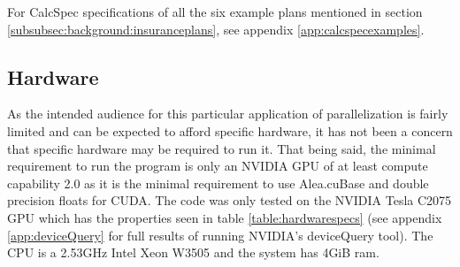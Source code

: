 For CalcSpec specifications of all the six example plans mentioned in section \ref{subsubsec:background:insuranceplans}, see appendix \ref{app:calcspecexamples}.

\subsection{Hardware}\label{subsec:background:hardware}
As the intended audience for this particular application of parallelization is fairly limited and can be expected to afford specific hardware, it has not been a concern that specific hardware may be required to run it.
That being said, the minimal requirement to run the program is only an NVIDIA GPU of at least compute capability 2.0 as it is the minimal requirement to use Alea.cuBase and double precision floats for CUDA.
The code was only tested on the NVIDIA Tesla C2075 GPU which has the properties seen in table \ref{table:hardwarespecs} (see appendix \ref{app:deviceQuery} for full results of running NVIDIA's deviceQuery tool).
The CPU is a 2.53GHz Intel Xeon W3505 and the system has 4GiB ram.

\begin{table}[H]
\centering
{}
\caption{Hardware properties of test machine\label{table:hardwarespecs}}
\end{table}

